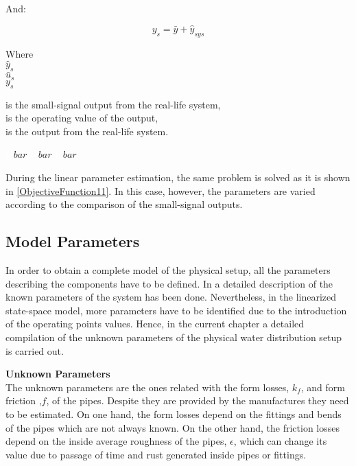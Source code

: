 And:

\begin{equation}
  y_{s} = \bar{y} + \hat{y}_{sys} 
 \label{u_smallsignal}
\end{equation}

\begin{minipage}[t]{0.20\textwidth}
Where\\
\hspace*{8mm} $\hat{y}_{s}$ \\
\hspace*{8mm} $\bar{u}_{s}$ \\
\hspace*{8mm} $y_{s}$ 
\end{minipage}
\begin{minipage}[t]{0.68\textwidth}
\vspace*{2mm}
is the small-signal output from the real-life system, \\
is the operating value of the output,\\
is the output from the real-life system. 
\end{minipage}
\begin{minipage}[t]{0.10\textwidth}
\vspace*{2mm}
\textcolor{White}{te}$\unit{bar}$
\textcolor{White}{te}$\unit{bar}$
\textcolor{White}{te}$\unit{bar}$
\end{minipage} 

During the linear parameter estimation, the same problem is solved as it is shown in \eqref{ObjectiveFunction11}. In this case, however, the parameters are varied according to the comparison of the small-signal outputs.  

\subsection{Model Parameters}
\label{estimateParameters}
In order to obtain a complete model of the physical setup, all the parameters describing the components have to be defined. In  a detailed
description of the known parameters of the system has been done. Nevertheless, in the linearized state-space model, more parameters have to be identified
due to the introduction of the operating points values. Hence, in the current chapter a detailed compilation of the unknown parameters of the physical water distribution setup is carried out.


\textbf{Unknown Parameters}\\
The unknown parameters are the ones related with the form losses, $k_f$, and form friction ,$f$, of the pipes. Despite they are 
provided by the manufactures they need to be estimated. On one hand, the form losses depend on the fittings and bends of the pipes which are not always known. 
On the other hand, the friction losses depend on the inside average roughness of the pipes, $\epsilon$, which can change its value due to passage of time 
and rust generated inside pipes or fittings. 

